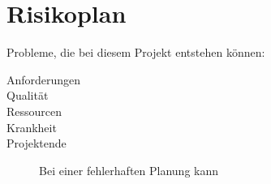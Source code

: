 \section{Risikoplan}
Probleme, die bei diesem Projekt entstehen können:
\begin{description}
	\item[Anforderungen] 
	\item[Qualität] 
	\item[Ressourcen]
	\item[Krankheit]
	\item[Projektende] Bei einer fehlerhaften Planung kann 
	
\end{description}